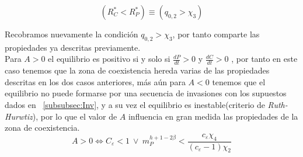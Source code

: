\begin{equation}
  (R^*_C < R^*_P) \equiv (q_{0,2} > \chi_3)
\end{equation}

Recobramos nuevamente la condici\'on $q_{0,2} > \chi_3$, por tanto comparte las propiedades ya descritas previamente. \\


Para $A>0$ el equilibrio es positivo si y solo si $\frac{dP}{dt} >0 $ y $\frac{dC}{dt} >0$ , por tanto en este caso tenemos que la zona de coexistencia hereda varias de las propiedades descritas en los dos casos anteriores, m\'as a\'un para $A <0$ tenemos que el equilibrio no puede formarse por una secuencia de invasiones con los supuestos dados en ~\ref{subsubsec:Inv}, y a su vez el equilibrio es inestable(criterio de \emph{Ruth-Hurwtiz}\citep{holt1997theoretical}), por lo que el valor de $A$ influencia en gran medida las propiedades de la zona de coexistencia.\\


\begin{equation}
  A > 0 \iff C_\varepsilon < 1 \  \lor \  m_P^{h + 1 - 2\beta} < \frac{c_\varepsilon \chi_4}{(c_\varepsilon - 1) \chi_2}
\end{equation}

